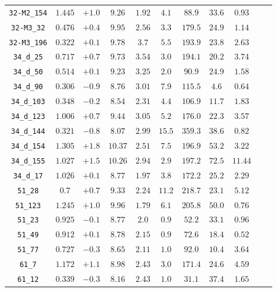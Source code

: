 \begin{table}[htbp]
\begin{tabular}{c c c c c c c c c c c}
\texttt{32-M2\_154}     & $1.445$ & $+1.0$ & $9.26 $ & $1.92 $ & $4.1 $ & $88.9 $ & $33.6$ & $0.93$ \\
\texttt{32-M3\_32}      & $0.476$ & $+0.4$ & $9.95 $ & $2.56 $ & $3.3 $ & $179.5$ & $24.9$ & $1.14$ \\
\texttt{32-M3\_196}     & $0.322$ & $+0.1$ & $9.78 $ & $3.7  $ & $5.5 $ & $193.9$ & $23.8$ & $2.63$ \\
\texttt{34\_d\_25}      & $0.717$ & $+0.7$ & $9.73 $ & $3.54 $ & $3.0 $ & $194.1$ & $20.2$ & $3.74$ \\
\texttt{34\_d\_50}      & $0.514$ & $+0.1$ & $9.23 $ & $3.25 $ & $2.0 $ & $90.9 $ & $24.9$ & $1.58$ \\
\texttt{34\_d\_90}      & $0.306$ & $-0.9$ & $8.76 $ & $3.01 $ & $7.9 $ & $115.5$ & $4.6 $ & $0.64$ \\
\texttt{34\_d\_103}     & $0.348$ & $-0.2$ & $8.54 $ & $2.31 $ & $4.4 $ & $106.9$ & $11.7$ & $1.83$ \\
\texttt{34\_d\_123}     & $1.006$ & $+0.7$ & $9.44 $ & $3.05 $ & $5.2 $ & $176.0$ & $22.3$ & $3.57$ \\
\texttt{34\_d\_144}     & $0.321$ & $-0.8$ & $8.07 $ & $2.99 $ & $15.5$ & $359.3$ & $38.6$ & $0.82$ \\
\texttt{34\_d\_154}     & $1.305$ & $+1.8$ & $10.37$ & $2.51 $ & $7.5 $ & $196.9$ & $53.2$ & $3.22$ \\
\texttt{34\_d\_155}     & $1.027$ & $+1.5$ & $10.26$ & $2.94 $ & $2.9 $ & $197.2$ & $72.5$ & $11.44$ \\
\texttt{34\_d\_17}      & $1.026$ & $+0.1$ & $8.77 $ & $1.97 $ & $3.8 $ & $172.2$ & $25.2$ & $2.29$ \\
\texttt{51\_28}         & $  0.7$ & $+0.7$ & $9.33 $ & $2.24 $ & $11.2$ & $218.7$ & $23.1$ & $5.12$ \\
\texttt{51\_123}        & $1.245$ & $+1.0$ & $9.96 $ & $1.79 $ & $6.1 $ & $205.8$ & $50.0$ & $0.76$ \\
\texttt{51\_23}         & $0.925$ & $-0.1$ & $8.77 $ & $2.0  $ & $0.9 $ & $52.2 $ & $33.1$ & $0.96$ \\
\texttt{51\_49}         & $0.912$ & $+0.1$ & $8.78 $ & $2.15 $ & $0.9 $ & $72.6 $ & $18.4$ & $0.52$ \\
\texttt{51\_77}         & $0.727$ & $-0.3$ & $8.65 $ & $2.11 $ & $1.0 $ & $92.0 $ & $10.4$ & $3.64$ \\
\texttt{61\_7}          & $1.172$ & $+1.1$ & $8.98 $ & $2.43 $ & $3.0 $ & $171.4$ & $24.6$ & $4.59$ \\
\texttt{61\_12}         & $0.339$ & $-0.3$ & $8.16 $ & $2.43 $ & $1.0 $ & $31.1 $ & $37.4$ & $1.65$ \\

\end{tabular}
\end{table}
